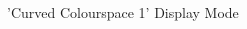 \clearpage
\begin{figure}[H]
    \centering
    \begin{adjustbox}{width=12cm,center}
    \end{adjustbox}
\caption{'Curved Colourspace 1' Display Mode}
\end{figure}


